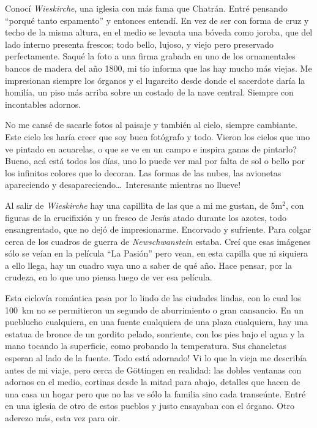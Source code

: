 Conoc\'i \emph{Wieskirche}, una iglesia con m\'as fama que Chatr\'an.
Entr\'e pensando ``porqu\'e tanto espamento'' y entonces entend\'i. En vez de
ser con forma de cruz y techo de la misma altura, en el medio se levanta una
b\'oveda como joroba, que del lado interno presenta frescos; todo bello,
lujoso, y viejo pero preservado perfectamente. Saqu\'e la foto a una firma
grabada en uno de los ornamentales bancos de madera del a\~no 1800, mi t\'io
informa que las hay mucho m\'as viejas. Me impresionan siempre los \'organos y
el lugarcito desde donde el sacerdote dar\'ia la homil\'ia, un piso m\'as
arriba sobre un costado de la nave central. Siempre con incontables adornos.

No me cans\'e de sacarle fotos al paisaje y tambi\'en al cielo, siempre
cambiante. Este cielo les har\'ia creer que soy buen fot\'ografo y todo.
\textquestiondown Vieron los cielos que uno ve pintado en acuarelas, o que se ve
en un campo e inspira ganas de pintarlo? Bueno, ac\'a est\'a todos los d\'ias,
uno lo puede ver mal por falta de sol o bello por los infinitos colores que lo
decoran. Las formas de las nubes, las avionetas apareciendo y
desapareciendo\ldots\ \textexclamdown Interesante mientras no llueve!

Al salir de \emph{Wieskirche} hay una capillita de las que a mi me gustan, de
5m$^2$, con figuras de la crucifixi\'on y un fresco de Jes\'us atado durante
los azotes, todo ensangrentado, que no dej\'o de impresionarme. Encorvado y
sufriente. Para colgar cerca de los cuadros de guerra de \emph{Newschwanstein}
estaba. Cre\'i que esas im\'agenes s\'olo se ve\'ian en la pel\'icula ``La
Pasi\'on'' pero vean, en esta capilla que ni siquiera a ello llega, hay un
cuadro vaya uno a saber de qu\'e a\~no. Hace pensar, por la crudeza, en lo que
uno piensa luego de ver esa pel\'icula.

Esta ciclov\'ia rom\'antica pasa por lo lindo de las ciudades lindas, con lo
cual los 100~km no se permitieron un segundo de aburrimiento o gran cansancio.
En un pueblucho cualquiera, en una fuente cualquiera de una plaza cualquiera,
hay una estatua de bronce de un gordito pelado, sonriente, con los pies bajo
el agua y la mano tocando la superficie, como probando la temperatura. Sus
chancletas esperan al lado de la fuente. \textexclamdown Todo est\'a adornado!
Vi lo que la vieja me describ\'ia antes de mi viaje, pero cerca de G\"ottingen
en realidad: las dobles ventanas con adornos en el medio, cortinas desde la
mitad para abajo, detalles que hacen de una casa un hogar pero que no las ve
s\'olo la familia sino cada transe\'unte. Entr\'e en una iglesia de otro de
estos pueblos y justo ensayaban con el \'organo. Otro aderezo m\'as, esta vez
para oir.

